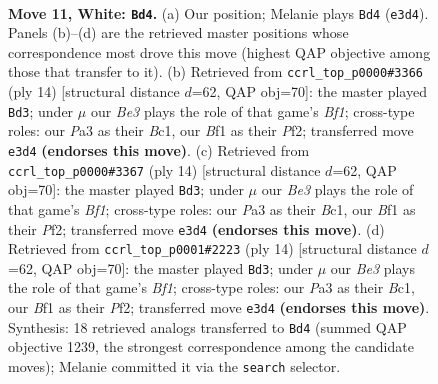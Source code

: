 \documentclass[11pt]{article}
\begin{document}
\clearpage

\begin{figure}[p]\centering
\begin{subfigure}{0.46\textwidth}\centering
\resizebox{\linewidth}{!}{%
\newchessgame
\chessboard[
  setfen={rnbq1k1r/1p2n1p1/4p3/pQPpPp1p/8/P1P1B3/2P2PPP/R3KBNR w KQ - 0 11},
  showmover=false,
  pgfstyle=straightmove, color=movearrow, markmove={e3-d4}
]}
\caption{}
\end{subfigure}\hfill
\begin{subfigure}{0.46\textwidth}\centering
\resizebox{\linewidth}{!}{%
\newchessgame
\chessboard[
  setfen={rnb1k2r/ppq1nppp/4p3/2ppP3/3P2Q1/P1P5/2P2PPP/R1B1KBNR w KQkq - 3 8},
  showmover=false,
  pgfstyle=straightmove, color=movearrow, markmove={f1-d3}
]}
\caption{}
\end{subfigure}
\\[4pt]
\begin{subfigure}{0.46\textwidth}\centering
\resizebox{\linewidth}{!}{%
\newchessgame
\chessboard[
  setfen={rnb1k2r/ppq1nppp/4p3/2ppP3/3P2Q1/P1P5/2P2PPP/R1B1KBNR w KQkq - 3 8},
  showmover=false,
  pgfstyle=straightmove, color=movearrow, markmove={f1-d3}
]}
\caption{}
\end{subfigure}\hfill
\begin{subfigure}{0.46\textwidth}\centering
\resizebox{\linewidth}{!}{%
\newchessgame
\chessboard[
  setfen={rnb1k2r/ppq1nppp/4p3/2ppP3/3P2Q1/P1P5/2P2PPP/R1B1KBNR w KQkq - 3 8},
  showmover=false,
  pgfstyle=straightmove, color=movearrow, markmove={f1-d3}
]}
\caption{}
\end{subfigure}
\caption{\textbf{Move 11, White: \texttt{Bd4}.} (a) Our position; Melanie plays \texttt{Bd4} (\texttt{e3d4}). Panels (b)--(d) are the retrieved master positions whose correspondence most drove this move (highest QAP objective among those that transfer to it). (b) Retrieved from \texttt{ccrl\_top\_p0000\#3366} (ply 14) [structural distance $d$=62, QAP obj=70]: the master played \texttt{Bd3}; under $\mu$ our \emph{Be3} plays the role of that game's \emph{Bf1}; cross-type roles: our \emph{P}a3 as their \emph{B}c1, our \emph{B}f1 as their \emph{P}f2; transferred move \texttt{e3d4} \textbf{(endorses this move)}. (c) Retrieved from \texttt{ccrl\_top\_p0000\#3367} (ply 14) [structural distance $d$=62, QAP obj=70]: the master played \texttt{Bd3}; under $\mu$ our \emph{Be3} plays the role of that game's \emph{Bf1}; cross-type roles: our \emph{P}a3 as their \emph{B}c1, our \emph{B}f1 as their \emph{P}f2; transferred move \texttt{e3d4} \textbf{(endorses this move)}. (d) Retrieved from \texttt{ccrl\_top\_p0001\#2223} (ply 14) [structural distance $d$=62, QAP obj=70]: the master played \texttt{Bd3}; under $\mu$ our \emph{Be3} plays the role of that game's \emph{Bf1}; cross-type roles: our \emph{P}a3 as their \emph{B}c1, our \emph{B}f1 as their \emph{P}f2; transferred move \texttt{e3d4} \textbf{(endorses this move)}. Synthesis: 18 retrieved analogs transferred to \texttt{Bd4} (summed QAP objective 1239, the strongest correspondence among the candidate moves); Melanie committed it via the \texttt{search} selector.}
\label{fig:thought-m20}
\end{figure}
\end{document}
